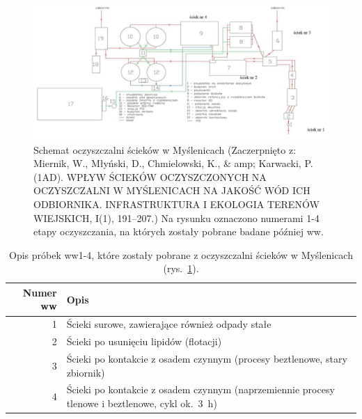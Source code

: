 \thispagestyle{empty}

\vspace{\fill}

\begin{figure}[h!]
    \label{fig:5}
    \centering
    \includegraphics[width=\textwidth]{figures/wwtp}
    \caption{
        Schemat oczyszczalni ścieków w Myślenicach
        (Zaczerpnięto z: Miernik, W., Młyński, D., Chmielowski, K.,
        \& amp; Karwacki, P. (1AD). WPŁYW ŚCIEKÓW
        OCZYSZCZONYCH NA OCZYSZCZALNI W MYŚLENICACH NA JAKOŚĆ WÓD ICH ODBIORNIKA.
        INFRASTRUKTURA I EKOLOGIA TERENÓW WIEJSKICH, I(1), 191–207.)
        Na rysunku oznaczono numerami 1-4 etapy oczyszczania, na których
        zostały pobrane badane później \acrshort{ww}.}
\end{figure}

\vspace{1cm}

\begin{table}[h!]
    \label{tab:1}
    \centering
    \caption{
        Opis próbek \acrshort{ww}1-4, które zostały pobrane
        z oczyszczalni ścieków w Myślenicach (rys.~\ref{fig:5}).
    }
    \begin{tabular}{rp{10cm}}
        Numer \acrshort{ww} & Opis\\
        \hline
        1 & Ścieki surowe, zawierające również odpady stałe\\
        2 & Ścieki po usunięciu lipidów (flotacji)\\
        3 & Ścieki po kontakcie z osadem czynnym \newline (procesy beztlenowe, stary zbiornik)\\
        4 & Ścieki po kontakcie z osadem czynnym \newline (naprzemiennie procesy tlenowe i beztlenowe, cykl ok.\ 3~h)\\
    \end{tabular}
\end{table}

